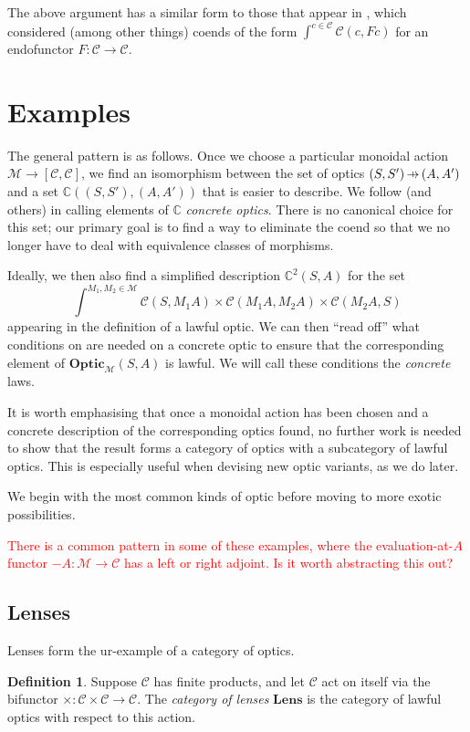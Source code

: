 \documentclass[11pt,a4paper]{article}
\theoremstyle{plain}
\theoremstyle{definition}
\newtheorem{definition}[theorem]{Definition}
\newcommand{\C}{\mathscr{C}}
\newcommand{\M}{\mathscr{M}}
\newcommand{\Optic}{\mathbf{Optic}}
\newcommand{\Lens}{\mathbf{Lens}}
\newcommand{\conc}{\mathbb{C}}
\newcommand{\conctwice}{\mathbb{C}^2}
\newcommand{\hto}{\ensuremath{\,\mathaccent\shortmid\rightarrow\,}}
\newcommand{\todo}[1]{\textcolor{red}{\small #1}}
\begin{document}
The above argument has a similar form to those that appear in \cite{OnTheTrace}, which considered (among other things) coends of the form $\int^{c \in \C} \C(c, Fc)$ for an endofunctor $F : \C \to \C$.

\section{Examples}\label{sec:examples}

The general pattern is as follows. Once we choose a particular monoidal action $\M \to [\C, \C]$, we find an isomorphism between the set of optics $(S, S') \hto (A, A')$ and a set $\conc((S, S'), (A, A'))$ that is easier to describe. We follow \cite{ProfunctorOptics} (and others) in calling elements of $\conc$ \emph{concrete optics}. There is no canonical choice for this set; our primary goal is to find a way to eliminate the coend so that we no longer have to deal with equivalence classes of morphisms.

Ideally, we then also find a simplified description $\conctwice(S, A)$ for the set \[ \int^{M_1, M_2 \in \M} \C(S, M_1 A) \times \C(M_1 A, M_2 A) \times \C(M_2 A, S)\] appearing in the definition of a lawful optic. We can then ``read off'' what conditions on are needed on a concrete optic to ensure that the corresponding element of $\Optic_\M(S, A)$ is lawful. We will call these conditions the \emph{concrete} laws.

It is worth emphasising that once a monoidal action has been chosen and a concrete description of the corresponding optics found, no further work is needed to show that the result forms a category of optics with a subcategory of lawful optics. This is especially useful when devising new optic variants, as we do later.

We begin with the most common kinds of optic before moving to more exotic possibilities.

\todo{There is a common pattern in some of these examples, where the evaluation-at-$A$ functor $-A : \M \to \C$ has a left or right adjoint. Is it worth abstracting this out?}

\subsection{Lenses}

Lenses form the ur-example of a category of optics.

\begin{definition}
  Suppose $\C$ has finite products, and let $\C$ act on itself via the bifunctor $\times : \C \times \C \to \C$. The \emph{category of lenses} $\Lens$ is the category of lawful optics with respect to this action.
\end{definition}
\end{document}
